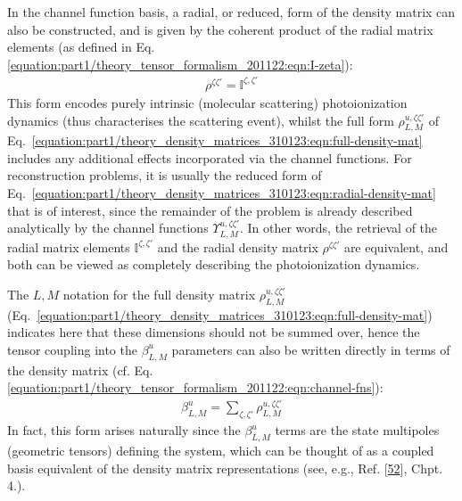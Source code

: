 \documentclass[letterpaper,table,10pt,english]{jupyterBook}
\begin{document}
\sphinxAtStartPar
In the channel function basis, a radial, or reduced, form of the density matrix can also be constructed, and is given by the coherent product of the radial matrix elements (as defined in Eq. \eqref{equation:part1/theory_tensor_formalism_201122:eqn:I-zeta}):
\begin{equation}\label{equation:part1/theory_density_matrices_310123:eqn:radial-density-mat}
\begin{split}
\rho^{\zeta\zeta'} = \mathbb{I}^{\zeta,\zeta'}
\end{split}
\end{equation}
\sphinxAtStartPar
This form encodes purely intrinsic (molecular scattering) photoionization dynamics (thus characterises the scattering event), whilst the full form \({\rho}_{L,M}^{u,\zeta\zeta'}\) of Eq. \eqref{equation:part1/theory_density_matrices_310123:eqn:full-density-mat} includes any additional effects incorporated via the channel functions. For reconstruction problems, it is usually the reduced form of Eq. \eqref{equation:part1/theory_density_matrices_310123:eqn:radial-density-mat} that is of interest, since the remainder of the problem is already described analytically by the channel functions \(\varUpsilon_{L,M}^{u,\zeta\zeta'}\). In other words, the retrieval of the radial matrix elements \(\mathbb{I}^{\zeta,\zeta'}\) and the radial density matrix \(\rho^{\zeta\zeta'}\) are equivalent, and both can be viewed as completely describing the photoionization dynamics.

\sphinxAtStartPar
The \(L,M\) notation for the full density matrix \({\rho}_{L,M}^{u,\zeta\zeta'}\) (Eq. \eqref{equation:part1/theory_density_matrices_310123:eqn:full-density-mat}) indicates here that these dimensions should not be summed over, hence the tensor coupling into the \(\beta_{L,M}^{u}\) parameters can also be written directly in terms of the density matrix (cf. Eq. \eqref{equation:part1/theory_tensor_formalism_201122:eqn:channel-fns}):
\begin{equation}\label{equation:part1/theory_density_matrices_310123:eqn:beta-density-mat}
\begin{split}
\beta_{L,M}^{u}=\sum_{\zeta,\zeta'}{\rho}_{L,M}^{u,\zeta\zeta'}
\end{split}
\end{equation}
\sphinxAtStartPar
In fact, this form arises naturally since the \(\beta_{L,M}^{u}\) terms are the state multipoles (geometric tensors) defining the system, which can be thought of as a coupled basis equivalent of the density matrix representations (see, e.g., Ref. {[}\hyperlink{cite.backmatter/bibliography:id444}{52}{]}, Chpt. 4.).
\end{document}
